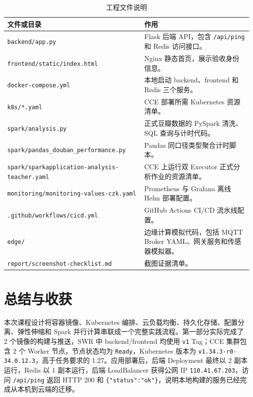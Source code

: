 \documentclass[bwprint]{report}
\begin{document}
\begin{table}[!htbp]
    \centering
    \caption{工程文件说明}
    \begin{tabularx}{\textwidth}{lX}
        \toprule[1.5pt]
        文件或目录 & 作用 \\
        \midrule[1pt]
        \texttt{backend/app.py} & Flask 后端 API，包含 \texttt{/api/ping} 和 Redis 访问接口。 \\
        \texttt{frontend/static/index.html} & Nginx 静态首页，展示验收身份信息。 \\
        \texttt{docker-compose.yml} & 本地启动 backend、frontend 和 Redis 三个服务。 \\
        \texttt{k8s/*.yaml} & CCE 部署所需 Kubernetes 资源清单。 \\
        \texttt{spark/analysis.py} & 正式豆瓣数据的 PySpark 清洗、SQL 查询与计时代码。 \\
        \texttt{spark/pandas\_douban\_performance.py} & Pandas 同口径类型聚合计时脚本。 \\
        \texttt{spark/sparkapplication-analysis-teacher.yaml} & CCE 上运行双 Executor 正式分析作业的资源清单。 \\
        \texttt{monitoring/monitoring-values-czk.yaml} & Prometheus 与 Grafana 离线 Helm 部署配置。 \\
        \texttt{.github/workflows/cicd.yml} & GitHub Actions CI/CD 流水线配置。 \\
        \texttt{edge/} & 边缘计算模拟代码，包括 MQTT Broker YAML、网关服务和传感器模拟器。 \\
        \texttt{report/screenshot-checklist.md} & 截图证据清单。 \\
        \bottomrule[1.5pt]
    \end{tabularx}
\end{table}

\section{总结与收获}

本次课程设计将容器镜像、Kubernetes 编排、云负载均衡、持久化存储、配置分离、弹性伸缩和 Spark 并行计算串联成一个完整实践流程。第一部分实际完成了 2 个镜像的构建与推送，SWR 中 backend/frontend 均使用 \texttt{v1} Tag；CCE 集群包含 2 个 Worker 节点，节点状态均为 \texttt{Ready}，Kubernetes 版本为 \texttt{v1.34.3-r0-34.0.12.3}，高于任务要求的 1.27。应用部署后，后端 Deployment 最终以 2 副本运行，Redis 以 1 副本运行，后端 LoadBalancer 获得公网 IP \texttt{110.41.67.203}，访问 \texttt{/api/ping} 返回 HTTP 200 和 \texttt{\{"status":"ok"\}}，说明本地构建的服务已经完成从本机到云端的迁移。
\end{document}

